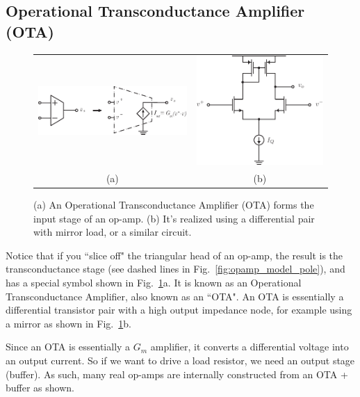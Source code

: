 \subsection{Operational Transconductance Amplifier (OTA)}
\begin{figure}[tb]
\begin{center}
\begin{tabular}{cc}
\includegraphics[scale=1.25]{OTA} &
\includegraphics[width=.35\columnwidth]{Diffpair_se_output.pdf} \\
(a) & (b) \\
\end{tabular}
\end{center}
\caption{(a) An Operational Transconductance Amplifier (OTA) forms the input stage of an op-amp.  (b) It's realized using a differential pair with mirror load, or a similar circuit.}
\label{fig:OTA}
\end{figure}

Notice that if you ``slice off" the triangular head of an op-amp, the result is the transconductance stage (see dashed lines in Fig.~\ref{fig:opamp_model_pole}), and has a special symbol shown in Fig.~\ref{fig:OTA}a.  It is known as an Operational Transconductance Amplifier, also known as an ``OTA".  An OTA is essentially a differential transistor pair with a high output impedance node, for example using a mirror as shown in Fig.~\ref{fig:OTA}b.
 
Since an OTA is essentially a $G_m$ amplifier, it converts a differential voltage into an output current.  So if we want to drive a load resistor, we need an output stage (buffer).  As such, many real op-amps are internally constructed from an OTA + buffer as shown.

